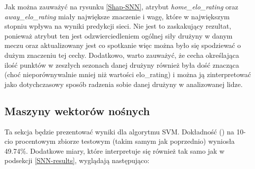 Jak można zauważyć na rysunku \ref{Shap-SNN}, atrybut \textit{home\_elo\_rating} oraz \textit{away\_elo\_rating} miały największe znaczenie i wagę, które w największym stopniu wpływa na wyniki predykcji sieci. Nie jest to zaskakujący rezultat, ponieważ atrybut ten jest odzwierciedleniem ogólnej siły drużyny w danym meczu oraz aktualizowany jest co spotkanie więc można było się spodziewać o dużym znaczeniu tej cechy. Dodatkowo, warto zauważyć, że cecha określająca ilość punktów w zeszłych sezonach danej drużyny również była dość znacząca (choć nieporównywalnie mniej niż wartości elo\_rating) i można ją zinterpretować jako dotychczasowy sposób radzenia sobie danej drużyny w analizowanej lidze.

\subsection{Maszyny wektorów nośnych}
Ta sekcja będzie prezentować wyniki dla algorytmu SVM. Dokładność () na 10-cio procentowym zbiorze testowym (takim samym jak poprzednio) wyniosła 49.74\%. Dodatkowe miary, które interpretuje się również tak samo jak w podsekcji \ref{SNN-results}, wyglądają następująco:

